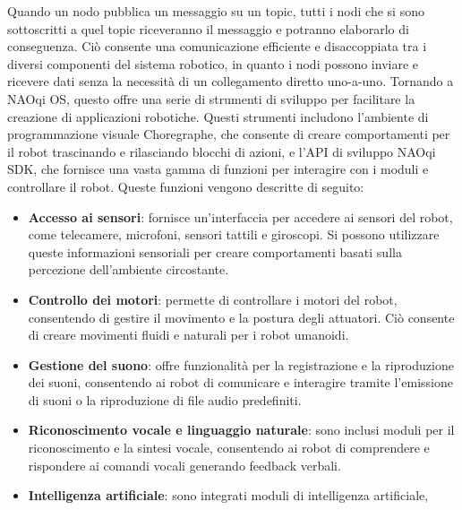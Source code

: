 \begin{sloppypar}
{ Quando un nodo pubblica un messaggio su un topic, tutti i nodi che si sono sottoscritti a quel topic riceveranno il messaggio e potranno elaborarlo di conseguenza. Ciò consente una comunicazione efficiente e disaccoppiata tra i diversi componenti del sistema robotico, in quanto i nodi possono inviare e ricevere dati senza la necessità di un collegamento diretto uno-a-uno.\vspace{1.5cm}\newline 
 Tornando a NAOqi OS, questo offre una serie di strumenti di sviluppo per facilitare la creazione di applicazioni robotiche. Questi strumenti includono l'ambiente di programmazione visuale Choregraphe, che consente di creare comportamenti per il robot trascinando e rilasciando blocchi di azioni, e l'API di sviluppo NAOqi SDK, che fornisce una vasta gamma di funzioni per interagire con i moduli e controllare il robot.\newline
 \vspace{0.3cm}
 Queste funzioni vengono descritte di seguito:
 \vspace{0.1cm}
 \begin{itemize}
     \item \textbf{Accesso ai sensori}: fornisce un’interfaccia per accedere ai
sensori del robot, come telecamere, microfoni, sensori tattili e giroscopi. Si
possono utilizzare queste informazioni sensoriali per creare comportamenti
basati sulla percezione dell’ambiente circostante.
\vspace{0.5cm}
     \item \textbf{Controllo dei motori}: permette di controllare i motori del robot,
consentendo di gestire il movimento e la postura degli attuatori. Ciò consente
di creare movimenti fluidi e naturali per i robot umanoidi.
\vspace{0.5cm}
     \item \textbf{Gestione del suono}: offre funzionalità per la registrazione e
la riproduzione dei suoni, consentendo ai robot di comunicare e interagire
tramite l’emissione di suoni o la riproduzione di file audio predefiniti.
\vspace{0.5cm}
     \item \textbf{Riconoscimento vocale e linguaggio naturale}: sono inclusi moduli
per il riconoscimento e la sintesi vocale, consentendo ai robot
di comprendere e rispondere ai comandi vocali generando feedback
verbali.
\vspace{0.5cm}
     \item \textbf{Intelligenza artificiale}: sono integrati moduli di intelligenza artificiale,

\end{itemize}}
\end{sloppypar}
